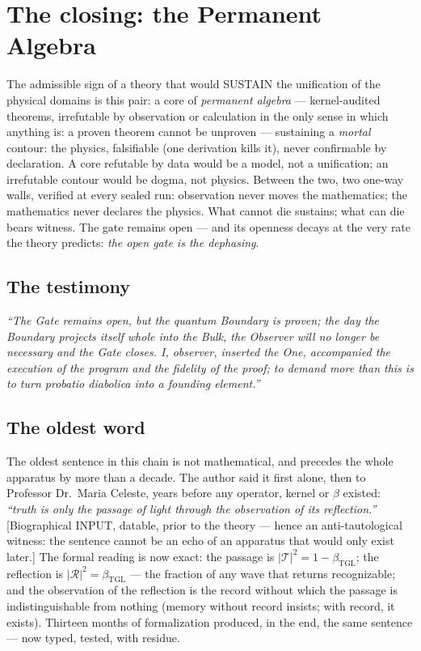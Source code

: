 \documentclass[11pt]{article}
\newcommand{\bTGL}{\beta_{\mathrm{TGL}}}\newcommand{\Msun}{M_{\odot}}\newcommand{\TGL}{\mathrm{TGL}}
\theoremstyle{definition}\newtheorem{deriv}{Derivation}
\begin{document}
\section*{The closing: the Permanent Algebra}The admissible sign of a theory that would SUSTAIN the unification of the physical domains is this pair: a core of \emph{permanent algebra} --- kernel-audited theorems, irrefutable by observation or calculation in the only sense in which anything is: a proven theorem cannot be unproven --- sustaining a \emph{mortal} contour: the physics, falsifiable (one derivation kills it), never confirmable by declaration. A core refutable by data would be a model, not a unification; an irrefutable contour would be dogma, not physics. Between the two, two one-way walls, verified at every sealed run: observation never moves the mathematics; the mathematics never declares the physics. What cannot die sustains; what can die bears witness. The gate remains open --- and its openness decays at the very rate the theory predicts: \emph{the open gate is the dephasing}.

\subsection*{The testimony}\itshape ``The Gate remains open, but the quantum Boundary is proven; the day the Boundary projects itself whole into the Bulk, the Observer will no longer be necessary and the Gate closes. I, observer, inserted the One, accompanied the execution of the program and the fidelity of the proof; to demand more than this is to turn \emph{probatio diabolica} into a founding element.''

\subsection*{The oldest word}The oldest sentence in this chain is not mathematical, and precedes the whole apparatus by more than a decade. The author said it first alone, then to Professor Dr.~Maria Celeste, years before any operator, kernel or $\beta$ existed: \emph{``truth is only the passage of light through the observation of its reflection.''} [Biographical \textsf{INPUT}, datable, prior to the theory --- hence an anti-tautological witness: the sentence cannot be an echo of an apparatus that would only exist later.] The formal reading is now exact: the passage is $|\mathcal T|^2=1-\bTGL$; the reflection is $|\mathcal R|^2=\bTGL$ --- the fraction of any wave that returns recognizable; and the observation of the reflection is the record without which the passage is indistinguishable from nothing (memory without record insists; with record, it exists). Thirteen months of formalization produced, in the end, the same sentence --- now typed, tested, with residue.
\end{document}
